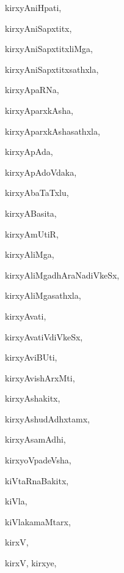 \begin{multicols}{3}
{\noindent
{kirxyAniHpati}, \pageref{kirxyAniHpati}

\noindent
{kirxyAniSapxtitx}, \pageref{kirxyAniSapxtitx}

\noindent
{kirxyAniSapxtitxliMga}, \pageref{kirxyAniSapxtitxliMga}

\noindent
{kirxyAniSapxtitxsathxla}, \pageref{kirxyAniSapxtitxsathxla}

\noindent
{kirxyApaRNa}, \pageref{kirxyApaRNa}

\noindent
{kirxyAparxkAsha}, \pageref{kirxyAparxkAsha}

\noindent
{kirxyAparxkAshasathxla}, \pageref{kirxyAparxkAshasathxla}

\noindent
{kirxyApAda}, \pageref{kirxyApAda}

\noindent
{kirxyApAdoVdaka}, \pageref{kirxyApAdoVdaka}

\noindent
{kirxyAbaTaTxlu}, \pageref{kirxyAbaTaTxlu}

\noindent
{kirxyABasita}, \pageref{kirxyABasita}

\noindent
{kirxyAmUtiR}, \pageref{kirxyAmUtiR}

\noindent
{kirxyAliMga}, \pageref{kirxyAliMga}

\noindent
{kirxyAliMgadhAraNadiVkeSx}, \pageref{kirxyAliMgadhAraNadiVkeSx}

\noindent
{kirxyAliMgasathxla}, \pageref{kirxyAliMgasathxla}

\noindent
{kirxyAvati}, \pageref{kirxyAvati}

\noindent
{kirxyAvatiVdiVkeSx}, \pageref{kirxyAvatiVdiVkeSx}

\noindent
{kirxyAviBUti}, \pageref{kirxyAviBUti}

\noindent
{kirxyAvishArxMti}, \pageref{kirxyAvishArxMti}

\noindent
{kirxyAshakitx}, \pageref{kirxyAshakitx}

\noindent
{kirxyAshudAdhxtamx}, \pageref{kirxyAshudAdhxtamx}

\noindent
{kirxyAsamAdhi}, \pageref{kirxyAsamAdhi}

\noindent
{kirxyoVpadeVsha}, \pageref{kirxyoVpadeVsha}

\noindent
{kiVtaRnaBakitx}, \pageref{kiVtaRnaBakitx}

\noindent
{kiVla}, \pageref{kiVla}

\noindent
{kiVlakamaMtarx}, \pageref{kiVlakamaMtarx}

\noindent
{kirxV}, \pageref{kirxV}

\noindent
{kirxV, kirxye}, \pageref{kirxV, kirxye}

}
\end{multicols}
